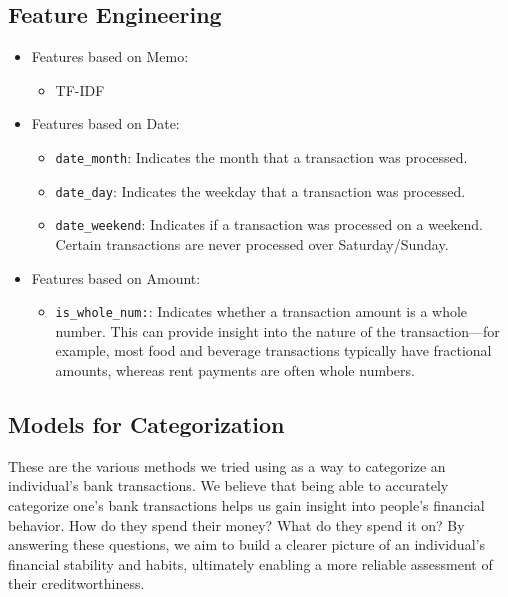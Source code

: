\documentclass[12pt,letterpaper]{article}
\begin{document}
\subsection{Feature Engineering}
\begin{itemize}
    \item {Features based on Memo:}
        \begin{itemize}
            \item {TF-IDF}
        \end{itemize}
    \item {Features based on Date:}
        \begin{itemize}
            \item 
                \texttt{date\_month}: Indicates the month that a transaction was processed.            
            \item 
                \texttt{date\_day}: Indicates the weekday that a transaction was processed. 
                
            \item 
                \texttt{date\_weekend}: Indicates if a transaction was processed on a weekend. Certain transactions are never processed over Saturday/Sunday.
        \end{itemize}
    \item {Features based on Amount:}
        \begin{itemize}
            \item 
                \texttt{is\_whole\_num:}: Indicates whether a transaction amount is a whole number. This can provide insight into the nature of the transaction—for example, most food and beverage transactions typically have fractional amounts, whereas rent payments are often whole numbers. 
        \end{itemize}
\end{itemize}

\subsection{Models for Categorization}
These are the various methods we tried using as a way to categorize an individual's bank transactions. We believe that being able to accurately categorize one’s bank transactions helps us gain insight into people’s financial behavior. How do they spend their money? What do they spend it on? By answering these questions, we aim to build a clearer picture of an individual’s financial stability and habits, ultimately enabling a more reliable assessment of their creditworthiness.
\end{document}

